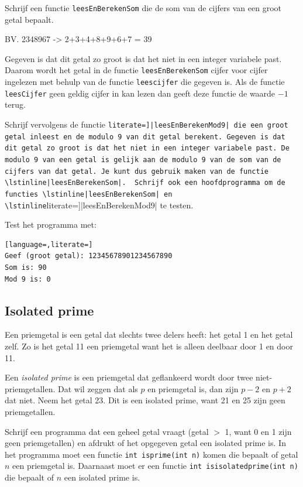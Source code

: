 \documentclass[a4paper,10pt,fleqn,twoside]{article}
\begin{document}
Schrijf een functie \lstinline|leesEnBerekenSom| die de som van de cijfers van een groot getal bepaalt. 

BV. 2348967 -> 2+3+4+8+9+6+7 = 39

Gegeven is dat dit getal zo groot is dat het niet in een integer variabele past. Daarom wordt het getal in de functie \lstinline|leesEnBerekenSom| cijfer voor cijfer ingelezen met behulp van de functie \lstinline|leescijfer| die gegeven is. Als de functie \lstinline|leesCijfer| geen geldig cijfer in kan lezen dan geeft deze functie de waarde $-1$ terug.

Schrijf vervolgens de functie \lstinline[literate=]|leesEnBerekenMod9| die een groot getal inleest en de modulo 9 van dit getal berekent. Gegeven is dat dit getal zo groot is dat het niet in een integer variabele past. De modulo 9 van een getal is gelijk aan de modulo 9 van de som van de cijfers van dat getal. Je kunt dus gebruik maken van de functie \lstinline|leesEnBerekenSom|.

Schrijf ook een hoofdprogramma om de functies \lstinline|leesEnBerekenSom| en \lstinline[literate=]|leesEnBerekenMod9| te testen.

Test het programma met:

\begin{lstlisting}[language=,literate=]
Geef (groot getal): 12345678901234567890
Som is: 90
Mod 9 is: 0
\end{lstlisting}


\subsection{Isolated prime}
Een priemgetal is een getal dat slechts twee delers heeft: het getal 1 en het getal zelf. Zo is het getal 11 een priemgetal want het is alleen deelbaar door 1 en door 11.

Een \textsl{isolated prime} is een priemgetal dat geflankeerd wordt door twee niet-priemgetallen. Dat wil zeggen dat als $p$ en priemgetal is, dan zijn $p-2$ en $p+2$ dat niet. Neem het getal 23. Dit is een isolated prime, want 21 en 25 zijn geen priemgetallen.

Schrijf een programma dat een geheel getal vraagt (getal $>$ 1, want 0 en 1 zijn geen priemgetallen) en afdrukt of het opgegeven getal een isolated prime is. In het programma moet een functie \lstinline|int isprime(int n)| komen die bepaalt of getal $n$ een priemgetal is. Daarnaast moet er een functie \lstinline|int isisolatedprime(int n)| die bepaalt of $n$ een isolated prime is.
\end{document}
